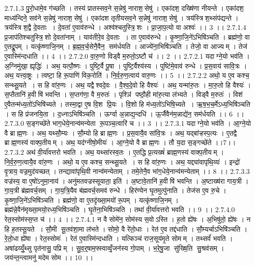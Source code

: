 2.7.1.3
पु॒रो॒धामे॒व ग॑च्छति । तस्य॑ प्रातस्सव॒ने स॒न्नेषु॑ नाराश॒॒सेषु॑ । एका॑दश॒ दख्षि॑णा नीयन्ते । एका॑दश॒ माध्य॑न्दिने॒ सव॑ने स॒न्नेषु॑ नाराश॒॒सेषु॑ । एका॑दश तृतीयसव॒ने स॒न्नेषु॑ नाराश॒॒सेषु॑ । त्रय॑स्त्रिश॒थ्संप॑द्यन्ते । त्रय॑स्त्रिश॒द्वै दे॒वताः । दे॒वता॑ ए॒वाव॑रुन्धे । अश्व॑श्चतुस्त्रि॒॒शः । प्रा॒जा॒प॒त्यो वा अश्वः॑ ।। 3 ।।
2.7.1.4
प्र॒जाप॑तिश्चतुस्त्रि॒॒शो दे॒वता॑नाम् । याव॑तीरे॒व दे॒वताः । ता ए॒वाव॑रुन्धे । कृ॒ष्णा॒जि॒ने॑ऽभिषि॑ञ्चति । ब्रह्म॑णो॒ वा ए॒तद्रू॒पम् । यत्कृ॑ष्णाजि॒नम् । ब्र॒ह्म॒व॒र्च॒सेनै॒वैन॒॒ सम॑र्धयति । आज्ये॑ना॒भिषि॑ञ्चति । तेजो॒ वा आज्यम् । तेज॑ ए॒वास्मि॑न्दधाति ।। 4 ।।
2.7.2.0
वा॒रु॒णो विड्वै म॒रुतो॒ऽष्टौ च॑ ।। 2 ।।
2.7.2.1
यदाग्ने॒यो भव॑ति । अ॒ग्निमु॑खा॒ ह्यृद्धिः॑ । अथ॒ यत्पौ॒ष्णः । पुष्टि॒र्वै पू॒षा । पुष्टि॒र्वैश्य॑स्य । पुष्टि॑मे॒वाव॑ रुन्धे । प्र॒स॒वाय॑ सावि॒त्रः । अथ॒ यत्त्वा॒ष्ट्रः । त्वष्टा॒ हि रू॒पाणि॑ विक॒रोति॑ । नि॒र्व॒रु॒ण॒त्वाय॑ वारु॒णः ।। 5 ।।
2.7.2.2
अथो॒ य ए॒व कश्च॒ सन्थ्सू॒यते । स हि वा॑रु॒णः । अथ॒ यद्वैश्वदे॒वः । वै॒श्व॒दे॒वो हि वैश्यः॑ । अथ॒ यन्मा॑रु॒तः । मा॒रु॒तो हि वैश्यः॑ । स॒प्तैतानि॑ ह॒वीषि॑ भवन्ति । स॒प्तग॑णा॒ वै म॒रुतः॑ । पृश्ञि॑ पष्ठौ॒ही मा॑रु॒त्या ल॑भ्यते । विड्वै म॒रुतः॑ । विश॑ ए॒वैतन्म॑ध्य॒तो॑ऽभिषि॑च्यते । तस्मा॒द्वा ए॒ष वि॒श प्रि॒यः । वि॒शो हि म॑ध्य॒तो॑ऽभिषि॒च्यते । ऋ॒ष॒भ॒च॒र्मेऽध्य॒भिषि॑ञ्चति । स हि प्र॑जनयि॒ता । द॒ध्नाऽभिषि॑ञ्चति । ऊर्ग्वा अ॒न्नाद्य॒न्दधि॑ । ऊ॒र्जैवैन॑म॒न्नाद्ये॑न॒ सम॑र्धयति ।। 6 ।।
2.7.3.0
स॒ङ्गच्छे॑ते भाग॒धेये॒नान्व॑मन्येता रू॒पञ्च॒त्वारि॑ च ।। 3 ।।
2.7.3.1
यदाग्ने॒यो भव॑ति । आ॒ग्ने॒यो वै ब्राह्म॒णः । अथ॒ यथ्सौ॒म्यः । सौ॒म्यो हि ब्राह्म॒णः । प्र॒स॒वायै॒व सा॑वि॒त्रः । अथ॒ यद्बा॑ऱ्हस्प॒त्यः । ए॒तद्वै ब्राह्म॒णस्य॑ वाक्प॒तीयम् । अथ॒ यद॑ग्नीषो॒मीयः॑ । आ॒ग्ने॒यो वै ब्राह्म॒णः । तौ य॒दा स॒ङ्गच्छे॑ते ।।7।।
2.7.3.2
अथ॑ वी॒र्या॑वत्तरो भवति । अथ॒ यथ्सा॑रस्व॒तः । ए॒तद्धि प्र॒त्यख्षं॑ ब्राह्म॒णस्य॑ वाक्प॒तीयम् । नि॒र्व॒रु॒ण॒त्वायै॒व वा॑रु॒णः । अथो॒ य ए॒व कश्च॒ सन्थ्सू॒यते । स हि वा॑रु॒णः । अथ॒ यद्द्या॑वापृथि॒व्यः॑ । इन्द्रो॑ वृ॒त्राय॒ वज्र॒मुद॑यच्छत् । तन्द्यावा॑पृथि॒वी नान्व॑मन्येताम् । तमे॒तेनै॒व भा॑ग॒धेये॒नान्व॑मन्येताम् ।। 8 ।।
2.7.3.3
वज्र॑स्य॒ वा ए॒षो॑ऽनुमा॒नाय॑ । अनु॑मतवज्रस्सूयाता॒ इति॑ । अ॒ष्टावे॒तानि॑ ह॒वीषि॑ भवन्ति । अ॒ष्टाख्ष॑रा गाय॒त्री । गा॒य॒त्री ब्र॑ह्मवर्च॒सम् । गा॒य॒त्रि॒यैव ब॑ह्मवर्च॒समव॑ रुन्धे । हिर॑ण्येन घृ॒तमुत्पु॑नाति । तेज॑स ए॒व रु॒चे । कृ॒ष्णा॒जि॒ने॑ऽभिषि॑ञ्चति । ब्रह्म॑णो॒ वा ए॒तदृ॑ख्सा॒मयो॑ रू॒पम् । यत्कृ॑ष्णाजि॒नम् । ब्रह्म॑न्ने॒वैन॑मृख्सा॒मयो॒रध्य॒भिषि॑ञ्चति । घृ॒तेना॒भिषि॑ञ्चति । तथा॑ वी॒र्या॑वत्तरो भवति ।। 9 ।।
2.7.4.0
रेत॒स्सोम॑स्स॒प्त च॑ ।। 4 ।।
2.7.4.1
न वै सोमे॑न॒ सोम॑स्य स॒वोऽस्ति । ह॒तो ह्ये॑षः । अ॒भिषु॑तो॒ ह्ये॑षः । न हि ह॒तस्सू॒यते । सौ॒मी सू॒तव॑शा॒मा ल॑भते । सोमो॒ वै रे॑तो॒धाः । रेत॑ ए॒व तद्द॑धाति । सौ॒म्यर्चाऽभिषि॑ञ्चति । रे॒तो॒धा ह्ये॑षा । रेत॒स्सोमः॑ । रेत॑ ए॒वास्मि॑न्दधाति । यत्किञ्च॑ राज॒सूय॑मृ॒ते सोमम् । तथ्सर्वं॑ भवति । अषा॑ढय्युँ॒थ्सु पृत॑नासु॒ पप्रिम् । सु॒व॒र्॒षाम॒फ्स्वाव्वृँ॒जन॑स्य गो॒पाम् । भ॒रे॒षु॒जा सु॑ख्षि॒ति सु॒श्रव॑सम् । जय॑न्त॒न्त्वामनु॑ मदेम सोम ।। 10 ।।
